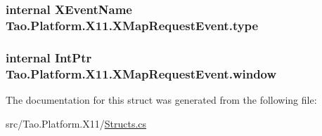 \label{struct_tao_1_1_platform_1_1_x11_1_1_x_map_request_event_afc68c0f280edbd3f36b705b740fbc1af}
\hypertarget{struct_tao_1_1_platform_1_1_x11_1_1_x_map_request_event_ae783f1bba0ff97828d0e8a099975fb59}{
\subsubsection[{type}]{\setlength{\rightskip}{0pt plus 5cm}internal {\bf XEventName} {\bf Tao.Platform.X11.XMapRequestEvent.type}}}
\label{struct_tao_1_1_platform_1_1_x11_1_1_x_map_request_event_ae783f1bba0ff97828d0e8a099975fb59}
\hypertarget{struct_tao_1_1_platform_1_1_x11_1_1_x_map_request_event_a5f44987927adc5b252795b18600363e3}{
\subsubsection[{window}]{\setlength{\rightskip}{0pt plus 5cm}internal IntPtr {\bf Tao.Platform.X11.XMapRequestEvent.window}}}
\label{struct_tao_1_1_platform_1_1_x11_1_1_x_map_request_event_a5f44987927adc5b252795b18600363e3}


The documentation for this struct was generated from the following file:\begin{DoxyCompactItemize}
\item 
src/Tao.Platform.X11/\hyperlink{_structs_8cs}{Structs.cs}\end{DoxyCompactItemize}
